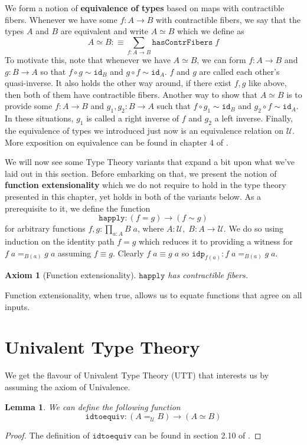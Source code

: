\documentclass[12pt]{report}
\newtheorem{lem}[thm]{Lemma}
\newtheorem{axiom}[thm]{Axiom}
\theoremstyle{definition}
\begin{document}
 	We form a notion of \textbf{equivalence of types} based on maps with contractible fibers. 
 	Whenever we have some $f : A\rightarrow B$ with contractible fibers, we say that the types $A$ and $B$ are equivalent and write $A \simeq B$ which we define as 
 	$$A\simeq B :\equiv \sum_{f : A \rightarrow B}\mathtt{hasContrFibers}\;f$$ 
 	To motivate this, note that whenever we have $A\simeq B$, we can form $f : A\rightarrow B$ and $g : B \rightarrow A$ so that $f\circ g \sim \mathtt{id}_B$ and $g\circ f \sim \mathtt{id}_A$. 
 	$f$ and $g$ are called each other's quasi-inverse.
 	It also holds the other way around, if there exist $f,g$ like above, then both of them have contractible fibers. 
 	Another way to show that $A\simeq B$ is to provide some $f : A\rightarrow B$ and $g_1,g_2 : B \rightarrow A$ such that $f \circ g_1 \sim \mathtt{id}_B$ and $g_2 \circ f \sim \mathtt{id}_A$. 
 	In these situations, $g_1$ is called a right inverse of $f$ and $g_2$ a left inverse. 
 	Finally, the equivalence of types we introduced just now is an equivalence relation on $\mathcal{U}$. 
 	More exposition on equivalence can be found in chapter 4 of \cite{hottbook}.

 	We will now see some Type Theory variants that expand a bit upon what we've laid out in this section. 
 	Before embarking on that, we present the notion of \textbf{function extensionality} which we do not require to hold in the type theory presented in this chapter, yet holds in both of the variants below. 
 	As a prerequisite to it, we define the function 
 	$$\mathtt{happly} : (f = g) \rightarrow (f \sim g)$$
 	for arbitrary functions $f,g : \prod_{a :A}B\;a$, where $A : \mathcal{U},\; B : A \rightarrow \mathcal{U}$. We do so using induction on the identity path $f = g$ which reduces it to providing a witness for $f\;a =_{B(a)} g\;a$ assuming $f \equiv g$. 
 	Clearly $f\;a \equiv g\;a$ so $\mathtt{idp}_{f(a)} : f\;a =_{B(a)} g\;a$. 
 	\begin{axiom}[Function extensionality] 
 	$\mathtt{happly}$ has contractible fibers. 
 	\end{axiom}
 	Function extensionality, when true, allows us to equate functions that agree on all inputs. 

\section{Univalent Type Theory}
We get the flavour of Univalent Type Theory (UTT) that interests us by assuming the axiom of Univalence.
\begin{lem}
We can define the following function
$$\mathtt{idtoequiv} : (A=_\mathcal{U}B) \rightarrow (A\simeq B)$$
\end{lem}
\begin{proof}
The definition of $\mathtt{idtoequiv}$ can be found in section 2.10 of \cite{hottbook}. 
\end{proof}
\end{document}
